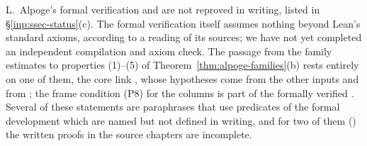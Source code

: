 \documentclass[10pt]{amsart}
\theoremstyle{definition}
\theoremstyle{remark}
\begin{document}
L.~Alpoge's formal verification \cite{CharacterFamily} and are not
reproved in writing, listed in \S\ref{inp:ssec-status}(c). The formal
verification itself assumes nothing beyond Lean's standard axioms,
according to a reading of its sources; we have not yet completed an
independent compilation and axiom check. The passage from
the family estimates to properties (1)--(5) of
Theorem~\ref{thm:alpoge-families}(b) rests entirely on one of them, the
core link \cite[Proposition~\ref{A-i4:Lprop-fam}(c)]{Annex}, whose hypotheses
come from the other inputs and from \cite[Theorem~\ref{A-i4:thm-top}]{Annex};
the frame condition (P8) for the columns is part of the formally verified
\cite[Proposition~\ref{A-i4:Lprop-fam}(b)]{Annex}. Several of these
statements are paraphrases that use predicates of the formal development
which are named but not defined in writing, and for two of them
(\cite[Propositions~\ref{A-i1:prop-closed} and~\ref{A-i1:prop-linkG-res}]{Annex})
the written proofs in the source chapters are incomplete.
\end{document}
